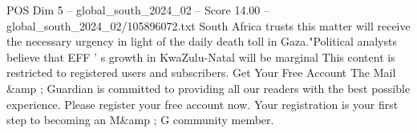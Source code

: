 \begin{textsample}{POS Dim 5 – global\_south\_2024\_02 – Score 14.00 – global\_south\_2024\_02/105896072.txt}
South Africa trusts this matter will receive the necessary urgency in light of the daily death toll in Gaza."Political analysts believe that EFF ' s growth in KwaZulu-Natal will be marginal This content is restricted to registered users and subscribers.
Get Your Free Account The Mail \&amp ; Guardian is committed to providing all our readers with the best possible experience.
Please register your free account now.
Your registration is your first step to becoming an M\&amp ; G community member.

\end{textsample}
